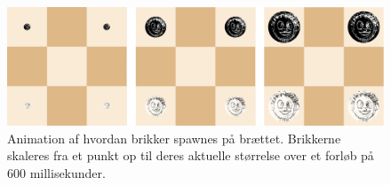 \begin{figure}[H]
\centering
\includegraphics[width = 0.8  \textwidth]{Figurer/spawn.pdf}
\caption{Animation af hvordan brikker spawnes på brættet. Brikkerne skaleres fra et punkt op til deres aktuelle størrelse over et forløb på 600 millisekunder.}
\label{fig:spawn}
\end{figure}

